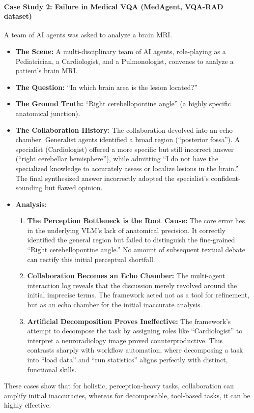 \documentclass{article}
\begin{document}
\paragraph{Case Study 2: Failure in Medical VQA (MedAgent, VQA-RAD dataset)}
A team of AI agents was asked to analyze a brain MRI.
\begin{itemize}
    \item \textbf{The Scene:} A multi-disciplinary team of AI agents, role-playing as a Pediatrician, a Cardiologist, and a Pulmonologist, convenes to analyze a patient's brain MRI.
    \item \textbf{The Question:} ``In which brain area is the lesion located?''
    \item \textbf{The Ground Truth:} ``Right cerebellopontine angle'' (a highly specific anatomical junction).
    \item \textbf{The Collaboration History:} The collaboration devolved into an echo chamber. Generalist agents identified a broad region (``posterior fossa''). A specialist (Cardiologist) offered a more specific but still incorrect answer (``right cerebellar hemisphere''), while admitting ``I do not have the specialized knowledge to accurately assess or localize lesions in the brain.'' The final synthesized answer incorrectly adopted the specialist's confident-sounding but flawed opinion.
    \item \textbf{Analysis:}
    \begin{enumerate}
        \item \textbf{The Perception Bottleneck is the Root Cause:} The core error lies in the underlying VLM's lack of anatomical precision. It correctly identified the general region but failed to distinguish the fine-grained ``Right cerebellopontine angle.'' No amount of subsequent textual debate can rectify this initial perceptual shortfall.
        \item \textbf{Collaboration Becomes an Echo Chamber:} The multi-agent interaction log reveals that the discussion merely revolved around the initial imprecise terms. The framework acted not as a tool for refinement, but as an echo chamber for the initial inaccurate analysis.
        \item \textbf{Artificial Decomposition Proves Ineffective:} The framework’s attempt to decompose the task by assigning roles like ``Cardiologist'' to interpret a neuroradiology image proved counterproductive. This contrasts sharply with workflow automation, where decomposing a task into ``load data'' and ``run statistics'' aligns perfectly with distinct, functional skills.
    \end{enumerate}
\end{itemize}
These cases show that for holistic, perception-heavy tasks, collaboration can amplify initial inaccuracies, whereas for decomposable, tool-based tasks, it can be highly effective.
\end{document}
